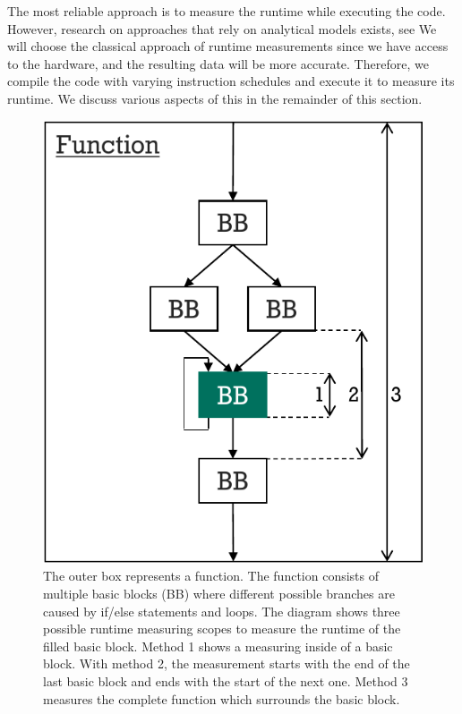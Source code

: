 The most reliable approach is to measure the runtime while executing the code.
However, research on approaches that rely on analytical models exists, see  %
We will choose the classical approach of runtime measurements since we have access to the hardware, and the resulting data will be more accurate.
Therefore, we compile the code with varying instruction schedules and execute it to measure its runtime.
We discuss various aspects of this in the remainder of this section.

\begin{figure}
    \centering
    \includegraphics[scale=0.8]{img/ppt/runtime_measurement_scopes-crop.pdf}
    \caption[Possibile Scopes for Measuring Runtimes]{The outer box represents a function. 
    The function consists of multiple basic blocks (BB) where different possible branches are caused by if/else statements and loops. 
    The diagram shows three possible runtime measuring scopes to measure the runtime of the filled basic block.
    Method 1 shows a measuring inside of a basic block. 
    With method 2, the measurement starts with the end of the last basic block and ends with the start of the next one.
    Method 3 measures the complete function which surrounds the basic block.}
    \label{fig:approach:runtime_scopes}
\end{figure}

